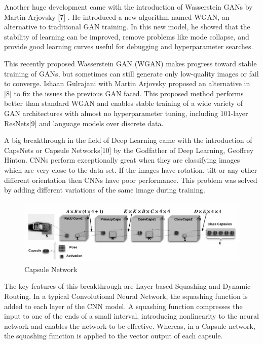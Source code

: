 Another huge development came with the introduction of Wasserstein GANs by Martin Arjovsky [7] . He introduced a new algorithm named WGAN, an alternative to traditional GAN training. In this new model, he showed that the stability of learning can be improved, remove problems like mode collapse, and provide good learning curves useful for debugging and hyperparameter searches.\par\bigskip
This recently proposed Wasserstein GAN (WGAN) makes progress toward stable training of GANs, but sometimes can still generate only low-quality images or fail to converge. 
Ishaan Gulrajani with Martin Arjovsky proposed an alternative in [8] to fix the issues the previous GAN faced. This proposed method performs better than standard WGAN and enables stable training of a wide variety of GAN architectures with almost no hyperparameter tuning, including 101-layer ResNets[9] and language models over discrete data.\par\bigskip
A big breakthrough in the field of Deep Learning came with the introduction of CapsNets or Capsule Networks[10] by the Godfather of Deep Learning, Geoffrey Hinton. CNNs perform exceptionally great when they are classifying images which are very close to the data set. If the images have rotation, tilt or any other different orientation then CNNs have poor performance. This problem was solved by adding different variations of the same image during training.\par\bigskip
\bigskip
\begin{figure}[H]
\centering\includegraphics[width=1\textwidth]{images/caps.png}
\caption{Capsule Network}
\end{figure}
The key features of this breakthrough are Layer based Squashing and Dynamic Routing.
In a typical Convolutional Neural Network, the squashing function is added to each layer of the CNN model. A squashing function compresses the input to one of the ends of a small interval, introducing nonlinearity to the neural network and enables the network to be effective. Whereas, in a Capsule network, the squashing function is applied to the vector output of each capsule.\par\bigskip
